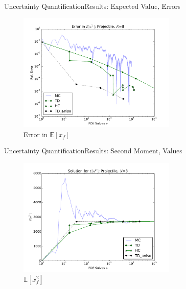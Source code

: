 \documentclass{beamer}
\newcommand{\expv}[1]{\ensuremath{\mathbb{E}[ #1]}}
\begin{document}
\begin{frame}{Uncertainty Quantification}{Results: Expected Value, Errors}
  \begin{figure}[h!]
    \centering
      \includegraphics[width=0.7\textwidth]{../graphics/projectile_errs_aniso}
      \caption{Error in $\expv{x_f}$}
  \end{figure}
\end{frame}

\begin{frame}{Uncertainty Quantification}{Results: Second Moment, Values}
  \begin{figure}[h!]
    \centering
      \includegraphics[width=0.7\textwidth]{../graphics/projectile_solns_aniso_variance}
      \caption{$\expv{x_f^2}$}
  \end{figure}
\end{frame}
\end{document}
